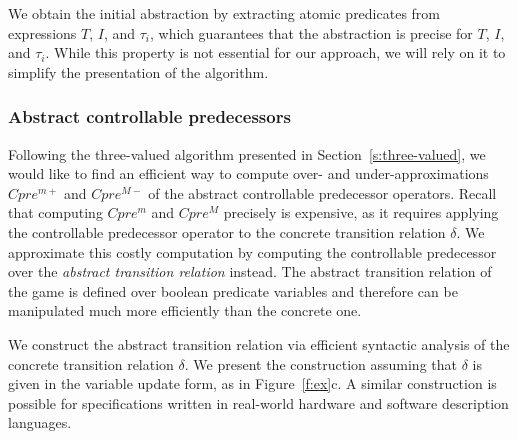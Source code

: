\documentclass{book}
\theoremstyle{definition}
\begin{document}
We obtain the initial abstraction by extracting atomic predicates from expressions $T$, $I$, and $\tau_i$, which guarantees that the abstraction is precise for $T$, $I$, and $\tau_i$. While this property is not essential for our approach, we will rely on it to simplify the presentation of the algorithm.

%

\subsubsection{Abstract controllable predecessors}\label{s:cpre}

Following the three-valued algorithm presented in Section~\ref{s:three-valued}, we would like to find an efficient way to compute over- and under-approximations $Cpre^{m+}$ and $Cpre^{M-}$ of the abstract controllable predecessor operators. Recall that computing $Cpre^m$ and $Cpre^M$ precisely is expensive, as it requires applying the controllable predecessor operator to the concrete transition relation $\delta$. We approximate this costly computation by computing the controllable predecessor over the \emph{abstract transition relation} instead. The abstract transition relation of the game is defined over boolean predicate variables and therefore can be manipulated much more efficiently than the concrete one.

We construct the abstract transition relation via efficient syntactic analysis of the concrete transition relation $\delta$. We present the construction assuming that $\delta$ is given in the variable update form, as in Figure~\ref{f:ex}c. A similar construction is possible for specifications written in real-world hardware and software description languages.
\end{document}

